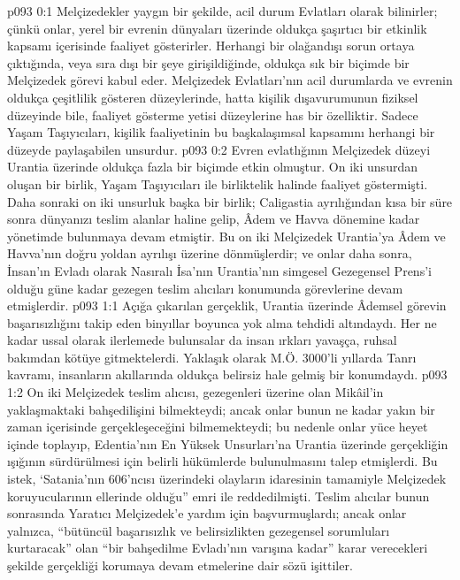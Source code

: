 \vs p093 0:1 Melçizedekler yaygın bir şekilde, acil durum Evlatları olarak bilinirler; çünkü onlar, yerel bir evrenin dünyaları üzerinde oldukça şaşırtıcı bir etkinlik kapsamı içerisinde faaliyet gösterirler. Herhangi bir olağandışı sorun ortaya çıktığında, veya sıra dışı bir şeye girişildiğinde, oldukça sık bir biçimde bir Melçizedek görevi kabul eder. Melçizedek Evlatları’nın acil durumlarda ve evrenin oldukça çeşitlilik gösteren düzeylerinde, hatta kişilik dışavurumunun fiziksel düzeyinde bile, faaliyet gösterme yetisi düzeylerine has bir özelliktir. Sadece Yaşam Taşıyıcıları, kişilik faaliyetinin bu başkalaşımsal kapsamını herhangi bir düzeyde paylaşabilen unsurdur.
\vs p093 0:2 Evren evlatlığının Melçizedek düzeyi Urantia üzerinde oldukça fazla bir biçimde etkin olmuştur. On iki unsurdan oluşan bir birlik, Yaşam Taşıyıcıları ile birliktelik halinde faaliyet göstermişti. Daha sonraki on iki unsurluk başka bir birlik; Caligastia ayrılığından kısa bir süre sonra dünyanızı teslim alanlar haline gelip, Âdem ve Havva dönemine kadar yönetimde bulunmaya devam etmiştir. Bu on iki Melçizedek Urantia’ya Âdem ve Havva’nın doğru yoldan ayrılışı üzerine dönmüşlerdir; ve onlar daha sonra, İnsan’ın Evladı olarak Nasıralı İsa’nın Urantia’nın simgesel Gezegensel Prens’i olduğu güne kadar gezegen teslim alıcıları konumunda görevlerine devam etmişlerdir.
\vs p093 1:1 Açığa çıkarılan gerçeklik, Urantia üzerinde Âdemsel görevin başarısızlığını takip eden binyıllar boyunca yok alma tehdidi altındaydı. Her ne kadar ussal olarak ilerlemede bulunsalar da insan ırkları yavaşça, ruhsal bakımdan kötüye gitmektelerdi. Yaklaşık olarak M.Ö. 3000’li yıllarda Tanrı kavramı, insanların akıllarında oldukça belirsiz hale gelmiş bir konumdaydı.
\vs p093 1:2 On iki Melçizedek teslim alıcısı, gezegenleri üzerine olan Mikâil’in yaklaşmaktaki bahşedilişini bilmekteydi; ancak onlar bunun ne kadar yakın bir zaman içerisinde gerçekleşeceğini bilmemekteydi; bu nedenle onlar yüce heyet içinde toplayıp, Edentia’nın En Yüksek Unsurları’na Urantia üzerinde gerçekliğin ışığının sürdürülmesi için belirli hükümlerde bulunulmasını talep etmişlerdi. Bu istek, ‘Satania’nın 606’ncısı üzerindeki olayların idaresinin tamamiyle Melçizedek koruyucularının ellerinde olduğu” emri ile reddedilmişti. Teslim alıcılar bunun sonrasında Yaratıcı Melçizedek’e yardım için başvurmuşlardı; ancak onlar yalnızca, “bütüncül başarısızlık ve belirsizlikten gezegensel sorumluları kurtaracak” olan “bir bahşedilme Evladı’nın varışına kadar” karar verecekleri şekilde gerçekliği korumaya devam etmelerine dair sözü işittiler.
